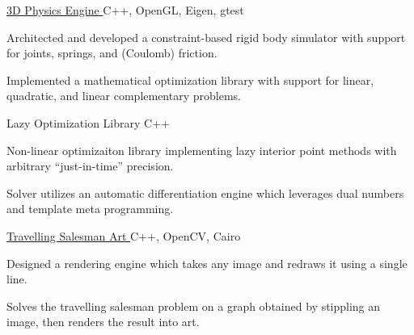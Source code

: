 

\begin{cventries}

  \cvprojectentry
    {\href{https://www.github.com/RileyJackson2000/fluffy-computing-machine}{{3D Physics Engine }\faGithubSquare\acvHeaderIconSep}} %
    {C++, OpenGL, Eigen, gtest} %
    {
      \begin{cvitems} %
      \item {Architected and developed a constraint-based rigid body simulator with support for joints, springs, and (Coulomb) friction.}
      \item {Implemented a mathematical optimization library with support for linear, quadratic, and linear complementary problems.}
      \end{cvitems}
    }

  \cvprojectentry
    {Lazy Optimization Library} %
    {C++} %
    {
      \begin{cvitems} %
      \item {Non-linear optimizaiton library implementing lazy interior point methods with arbitrary ``just-in-time'' precision.}
      \item {Solver utilizes an automatic differentiation engine which leverages dual numbers and template meta programming.}
      \end{cvitems}
    }

  \cvprojectentry
    {\href{https://www.github.com/RileyJackson2000/tsp_art}{{Travelling Salesman Art }\faGithubSquare\acvHeaderIconSep}} %
    {C++, OpenCV, Cairo} %
    {
      \begin{cvitems} %
      \item {Designed a rendering engine which takes any image and redraws it using a single line.}
      \item {Solves the travelling salesman problem on a graph obtained by stippling an image, then renders the result into art.}
      \end{cvitems}
    }


\end{cventries}
